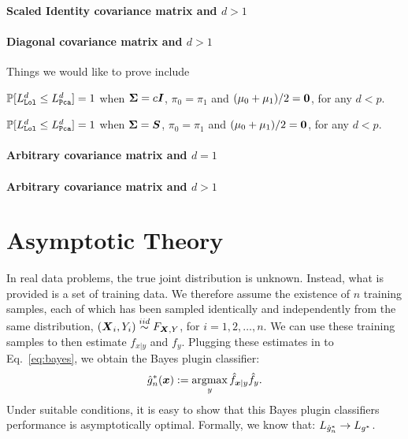 \documentclass[10pt]{article}
\begin{document}
\newpage
\paragraph{Scaled Identity covariance matrix and $d>1$}


\paragraph{Diagonal covariance matrix and $d>1$}

Things we would like to prove include

\begin{lem}
$\mathbb{P}[L_{{\sc \texttt{Lol}}}^d \leq L_{{\sc \texttt{Pca}}}^d]=1$ when $\boldsymbol{\Sigma}=c \boldsymbol{I}$, $\pi_0=\pi_1$ and $(\mu_0+\mu_1)/2=\boldsymbol{0}$, for any $d < p$.
\end{lem}

\begin{lem}
$\mathbb{P}[L_{{\sc \texttt{Lol}}}^d \leq L_{{\sc \texttt{Pca}}}^d]=1$ when $\boldsymbol{\Sigma}=\boldsymbol{S}$, $\pi_0=\pi_1$ and $(\mu_0+\mu_1)/2=\boldsymbol{0}$, for any $d < p$.
\end{lem}


\paragraph{Arbitrary covariance matrix and $d=1$}


\paragraph{Arbitrary covariance matrix and $d>1$}




\newpage
\section{Asymptotic Theory}

In real data problems,  the true joint distribution is unknown. Instead, what is provided is a set of training data.  We therefore assume the existence of $n$ training samples, each of which has been sampled identically and independently from the same distribution, $(\boldsymbol{X}_i,Y_i) \overset{iid}{\sim} F_{\boldsymbol{X},Y}$, for $i =1,2,\ldots, n$.  We can use these training samples to then estimate $f_{x|y}$ and $f_y$.  Plugging these estimates in to Eq.~\eqref{eq:bayes}, we obtain the Bayes plugin classifier:
\begin{align} \label{eq:plugin}
\mh{g}^*_n(\bx) := \argmax_y \mh{f}_{\bx|y}\mh{f}_y.
\end{align}
Under suitable conditions, it is easy to show that this Bayes plugin classifiers performance is asymptotically optimal.  
Formally, we know that:
$L_{\hat{g}^*_n} \rightarrow L_{g^*}$.
\end{document}
